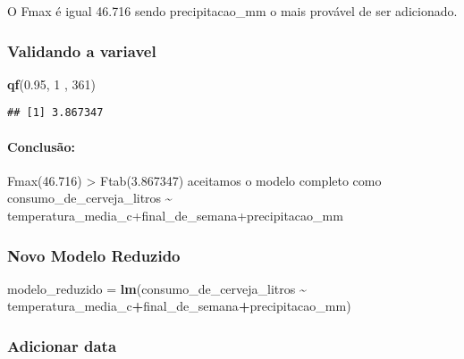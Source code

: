 \documentclass[
]{article}
\newenvironment{Shaded}{\begin{snugshade}}{\end{snugshade}}
\newcommand{\DecValTok}[1]{\textcolor[rgb]{0.00,0.00,0.81}{#1}}
\newcommand{\FloatTok}[1]{\textcolor[rgb]{0.00,0.00,0.81}{#1}}
\newcommand{\FunctionTok}[1]{\textcolor[rgb]{0.13,0.29,0.53}{\textbf{#1}}}
\newcommand{\NormalTok}[1]{#1}
\newcommand{\OtherTok}[1]{\textcolor[rgb]{0.56,0.35,0.01}{#1}}
\newcommand{\SpecialCharTok}[1]{\textcolor[rgb]{0.81,0.36,0.00}{\textbf{#1}}}
\begin{document}
O Fmax é igual 46.716 sendo precipitacao\_mm o mais provável de ser
adicionado.

\hypertarget{validando-a-variavel-1}{%
\subsubsection{Validando a variavel}\label{validando-a-variavel-1}}

\begin{Shaded}
\begin{Highlighting}[]
\FunctionTok{qf}\NormalTok{(}\FloatTok{0.95}\NormalTok{, }\DecValTok{1}\NormalTok{ , }\DecValTok{361}\NormalTok{)}
\end{Highlighting}
\end{Shaded}

\begin{verbatim}
## [1] 3.867347
\end{verbatim}

\hypertarget{conclusuxe3o-6}{%
\paragraph{Conclusão:}\label{conclusuxe3o-6}}

Fmax(46.716) \textgreater{} Ftab(3.867347) aceitamos o modelo completo
como consumo\_de\_cerveja\_litros \textasciitilde{}
temperatura\_media\_c+final\_de\_semana+precipitacao\_mm

\hypertarget{novo-modelo-reduzido-1}{%
\subsubsection{Novo Modelo Reduzido}\label{novo-modelo-reduzido-1}}

\begin{Shaded}
\begin{Highlighting}[]
\NormalTok{modelo\_reduzido }\OtherTok{=} \FunctionTok{lm}\NormalTok{(consumo\_de\_cerveja\_litros }\SpecialCharTok{\textasciitilde{}} 
\NormalTok{                       temperatura\_media\_c}\SpecialCharTok{+}\NormalTok{final\_de\_semana}\SpecialCharTok{+}\NormalTok{precipitacao\_mm)}
\end{Highlighting}
\end{Shaded}

\hypertarget{adicionar-data-2}{%
\subsubsection{Adicionar data}\label{adicionar-data-2}}
\end{document}
